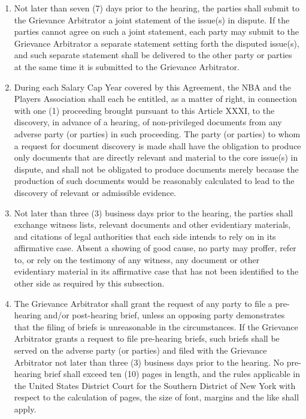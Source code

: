 \documentclass[
]{book}
\providecommand{\tightlist}{%
  \setlength{\itemsep}{0pt}\setlength{\parskip}{0pt}}
\begin{document}
\begin{enumerate}
\def\labelenumi{(\alph{enumi})}
\tightlist
\item
  Not later than seven (7) days prior to the hearing, the parties shall submit to the Grievance Arbitrator a joint statement of the issue(s) in dispute. If the parties cannot agree on such a joint statement, each party may submit to the Grievance Arbitrator a separate statement setting forth the disputed issue(s), and such separate statement shall be delivered to the other party or parties at the same time it is submitted to the Grievance Arbitrator.
\item
  During each Salary Cap Year covered by this Agreement, the NBA and the Players Association shall each be entitled, as a matter of right, in connection with one (1) proceeding brought pursuant to this Article XXXI, to the discovery, in advance of a hearing, of non-privileged documents from any adverse party (or parties) in such proceeding. The party (or parties) to whom a request for document discovery is made shall have the obligation to produce only documents that are directly relevant and material to the core issue(s) in dispute, and shall not be obligated to produce documents merely because the production of such documents would be reasonably calculated to lead to the discovery of relevant or admissible evidence.
\item
  Not later than three (3) business days prior to the hearing, the parties shall exchange witness lists, relevant documents and other evidentiary materials, and citations of legal authorities that each side intends to rely on in its affirmative case. Absent a showing of good cause, no party may proffer, refer to, or rely on the testimony of any witness, any document or other evidentiary material in its affirmative case that has not been identified to the other side as required by this subsection.
\item
  The Grievance Arbitrator shall grant the request of any party to file a pre-hearing and/or post-hearing brief, unless an opposing party demonstrates that the filing of briefs is unreasonable in the circumstances. If the Grievance Arbitrator grants a request to file pre-hearing briefs, such briefs shall be served on the adverse party (or parties) and filed with the Grievance Arbitrator not later than three (3) business days prior to the hearing. No pre-hearing brief shall exceed ten (10) pages in length, and the rules applicable in the United States District Court for the Southern District of New York with respect to the calculation of pages, the size of font, margins and the like shall apply.
\end{enumerate}
\end{document}

